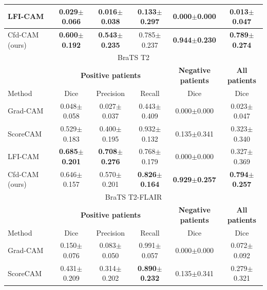 \begin{table}[t]
\begin{tabular}{l|c|c|c|c|c}
LFI-CAM\cite{lee2021lfi}         & 0.029$\pm$0.066          & 0.016$\pm$0.038          & 0.133$\pm$0.297          & 0.000$\pm$0.000               & 0.013$\pm$0.047          \\ \hline
Cfd-CAM (ours)   & \textbf{0.600$\pm$0.192} & \textbf{0.543$\pm$0.235} & 0.785$\pm$0.237 & \textbf{0.944$\pm$0.230}      & \textbf{0.789$\pm$0.274} \\ \hline \hline
\multicolumn{6}{c}{BraTS T2} \\ \hline
{\textbf{}}        & \multicolumn{3}{c|}{\textbf{Positive patients}} & \textbf{Negative patients} & \textbf{All patients} \\ \hline
Method           & Dice                  & Precision             & Recall                & Dice                       & Dice             \\ \hline
Grad-CAM\cite{selvaraju2017grad}         & 0.048$\pm$0.058          & 0.027$\pm$0.037          & 0.443$\pm$0.409          & 0.000$\pm$0.000               & 0.023$\pm$0.047          \\ \hline
ScoreCAM\cite{wang2020score}         & 0.529$\pm$0.183          & 0.400$\pm$0.195          & 0.932$\pm$0.132          & 0.135$\pm$0.341               & 0.323$\pm$0.340          \\ \hline
LFI-CAM\cite{lee2021lfi}          & \textbf{0.685$\pm$0.201}          & \textbf{0.708$\pm$0.276}          & 0.768$\pm$0.179          & 0.000$\pm$0.000               & 0.327$\pm$0.369          \\ \hline
Cfd-CAM (ours)   & 0.646$\pm$0.157 & 0.570$\pm$0.201 & \textbf{0.826$\pm$0.164} & \textbf{0.929$\pm$0.257}      & \textbf{0.794$\pm$0.257} \\ \hline \hline
\multicolumn{6}{c}{BraTS T2-FLAIR} \\ \hline
{\textbf{}}        & \multicolumn{3}{c|}{\textbf{Positive patients}} & \textbf{Negative patients} & \textbf{All patients} \\ \hline
Method           & Dice                  & Precision             & Recall                & Dice                       & Dice             \\ \hline
Grad-CAM\cite{selvaraju2017grad}        & 0.150$\pm$0.076          & 0.083$\pm$0.050          & 0.991$\pm$0.057          & 0.000$\pm$0.000               & 0.072$\pm$0.092          \\ \hline
ScoreCAM\cite{wang2020score}        & 0.431$\pm$0.209          & 0.314$\pm$0.202          & \textbf{0.890$\pm$0.232}          & 0.135$\pm$0.341               & 0.279$\pm$0.321          \\ \hline

\end{tabular}
\end{table}
